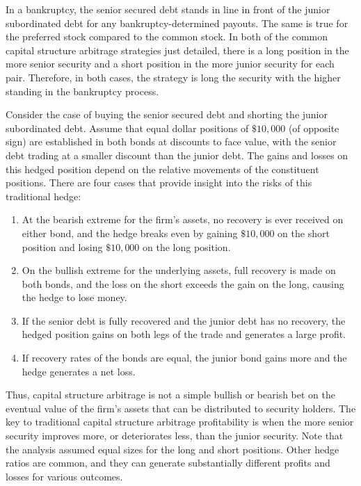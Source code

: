 \documentclass[11pt]{article}
\begin{document}
In a bankruptcy, the senior secured debt stands in line in front of the junior subordinated debt for any bankruptcy-determined payouts. The same is true for the preferred stock compared to the common stock. In both of the common capital structure arbitrage strategies just detailed, there is a long position in the more senior security and a short position in the more junior security for each pair. Therefore, in both cases, the strategy is long the security with the higher standing in the bankruptcy process.

Consider the case of buying the senior secured debt and shorting the junior subordinated debt. Assume that equal dollar positions of $\$ 10,000$ (of opposite sign) are established in both bonds at discounts to face value, with the senior debt trading at a smaller discount than the junior debt. The gains and losses on this hedged position depend on the relative movements of the constituent positions. There are four cases that provide insight into the risks of this traditional hedge:

\begin{enumerate}
  \item At the bearish extreme for the firm's assets, no recovery is ever received on either bond, and the hedge breaks even by gaining $\$ 10,000$ on the short position and losing $\$ 10,000$ on the long position.

  \item On the bullish extreme for the underlying assets, full recovery is made on both bonds, and the loss on the short exceeds the gain on the long, causing the hedge to lose money.

  \item If the senior debt is fully recovered and the junior debt has no recovery, the hedged position gains on both legs of the trade and generates a large profit.

  \item If recovery rates of the bonds are equal, the junior bond gains more and the hedge generates a net loss.

\end{enumerate}

Thus, capital structure arbitrage is not a simple bullish or bearish bet on the eventual value of the firm's assets that can be distributed to security holders. The key to traditional capital structure arbitrage profitability is when the more senior security improves more, or deteriorates less, than the junior security. Note that the analysis assumed equal sizes for the long and short positions. Other hedge ratios are common, and they can generate substantially different profits and losses for various outcomes.
\end{document}
